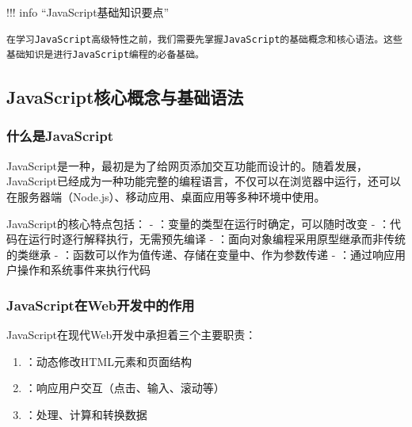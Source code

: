 !!! info ``JavaScript基础知识要点''

\begin{verbatim}
在学习JavaScript高级特性之前，我们需要先掌握JavaScript的基础概念和核心语法。这些基础知识是进行JavaScript编程的必备基础。
\end{verbatim}

\hypertarget{javascriptux6838ux5fc3ux6982ux5ff5ux4e0eux57faux7840ux8bedux6cd5}{%
\subsection{JavaScript核心概念与基础语法}\label{javascriptux6838ux5fc3ux6982ux5ff5ux4e0eux57faux7840ux8bedux6cd5}}

\hypertarget{ux4ec0ux4e48ux662fjavascript}{%
\subsubsection{什么是JavaScript}\label{ux4ec0ux4e48ux662fjavascript}}

JavaScript是一种，最初是为了给网页添加交互功能而设计的。随着发展，JavaScript已经成为一种功能完整的编程语言，不仅可以在浏览器中运行，还可以在服务器端（Node.js）、移动应用、桌面应用等多种环境中使用。

JavaScript的核心特点包括： - ：变量的类型在运行时确定，可以随时改变 - ：代码在运行时逐行解释执行，无需预先编译 - ：面向对象编程采用原型继承而非传统的类继承 - ：函数可以作为值传递、存储在变量中、作为参数传递 - ：通过响应用户操作和系统事件来执行代码

\hypertarget{javascriptux5728webux5f00ux53d1ux4e2dux7684ux4f5cux7528}{%
\subsubsection{JavaScript在Web开发中的作用}\label{javascriptux5728webux5f00ux53d1ux4e2dux7684ux4f5cux7528}}

JavaScript在现代Web开发中承担着三个主要职责：

\begin{enumerate}
\def\labelenumi{\arabic{enumi}.}
\tightlist
\item
  ：动态修改HTML元素和页面结构
\item
  ：响应用户交互（点击、输入、滚动等）
\item
  ：处理、计算和转换数据
\end{enumerate}

